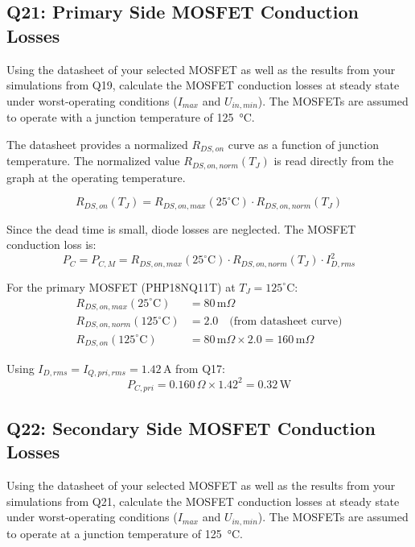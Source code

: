 \documentclass{PELsmallreport}
\begin{document}
\subsection{Q21: Primary Side MOSFET Conduction Losses} 
Using the datasheet of your selected MOSFET as well as the results from your simulations from Q19, calculate the MOSFET conduction losses at steady state under worst-operating conditions ($I_{max}$ and $U_{in,min}$). The MOSFETs are assumed to operate with a junction temperature of \SI{125}{\degreeCelsius}.


\begin{framed}
	\vspace{2em}
The datasheet provides a normalized $R_{DS,on}$ curve as a function of junction temperature. The normalized value $R_{DS,on,norm}(T_J)$ is read directly from the graph at the operating temperature.
 
\begin{equation}
    R_{DS,on}(T_J) = R_{DS,on,max}(25^\circ\text{C}) \cdot R_{DS,on,norm}(T_J)
\end{equation}
 
Since the dead time is small, diode losses are neglected. The MOSFET conduction loss is:
\begin{equation}
    P_{C} = P_{C,M} = R_{DS,on,max}(25^\circ\text{C}) \cdot R_{DS,on,norm}(T_J) \cdot I_{D,rms}^2
\end{equation}
 
For the primary MOSFET (PHP18NQ11T) at $T_J = 125^\circ$C:
\begin{align}
    R_{DS,on,max}(25^\circ\text{C}) &= 80\,\text{m}\Omega \\
    R_{DS,on,norm}(125^\circ\text{C}) &= 2.0 \quad\text{(from datasheet curve)} \\
    R_{DS,on}(125^\circ\text{C}) &= 80\,\text{m}\Omega \times 2.0 = 160\,\text{m}\Omega
\end{align}
 
Using $I_{D,rms} = I_{Q,pri,rms} = 1.42$\,A from Q17:
\begin{equation}
    P_{C,pri} = 0.160\,\Omega \times 1.42^2 = 0.32\,\text{W}
\end{equation}
  \vspace{2em}
\end{framed}

 \qquad 
\hfill{}

\subsection{Q22: Secondary Side MOSFET Conduction Losses} 
Using the datasheet of your selected MOSFET as well as the results from your simulations from Q21, calculate the MOSFET conduction losses at steady state under worst-operating conditions ($I_{max}$ and $U_{in,min}$). The MOSFETs are assumed to operate at a junction temperature of \SI{125}{\degreeCelsius}.
\end{document}
